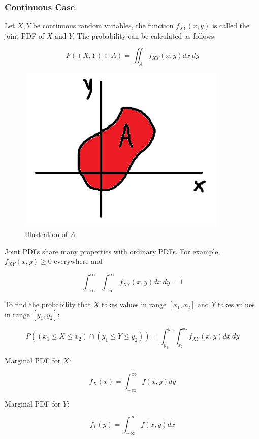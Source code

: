 \documentclass[12pt, a4paper]{article}
\newcounter{exa}
\begin{document}
\subsubsection{Continuous Case}

Let $X,Y$ be continuous random variables, the function $f_{XY}(x,y)$ is called the joint PDF of $X$ and $Y$. The probability can be calculated as follows

\[ P((X,Y)\in A) = \iint_A f_{XY}(x,y) dx \:dy \]

\begin{figure}[H]
\centering
\includegraphics[width=100mm]{21.png}
\caption{Illustration of $A$}
\end{figure}

Joint PDFs share many properties with ordinary PDFs. For example, $f_{XY}(x,y)\ge0$ everywhere and

\[ \int_{-\infty}^\infty \int_{-\infty}^\infty f_{XY}(x,y) dx \:dy = 1 \]

To find the probability that $X$ takes values in range $[x_1, x_2]$ and $Y$ takes values in range $[y_1, y_2]$:

\[ P((x_1\le X\le x_2) \cap (y_1\le Y\le y_2)) = \int_{y_1}^{y_2} \int_{x_1}^{x_2} f_{XY}(x,y) dx \:dy \]

Marginal PDF for $X$:

\[ f_X(x)=\int_{-\infty}^\infty f(x,y) dy \]

Marginal PDF for $Y$:

\[ f_Y(y)=\int_{-\infty}^\infty f(x,y) dx \]
\end{document}
